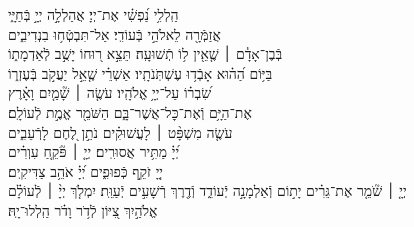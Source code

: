 \documentclass[twoside, openany, parskip=half, 11pt]{book}
\begin{document}
\negline

\ashrei


\begin{narrow}

\hfill \break
הַֽלְלִ֥י נַ֝פְשִׁ֗י אֶת־יְיָ׃ \hfill
אֲהַלְלָ֣ה יְיָ֣ בְּֿחַיָּ֑י \\ אֲזַמְּֿרָ֖ה לֵאלֹהַ֣י בְּֿעוֹדִֽי׃ \hfill
אַל־תִּבְטְֿח֥וּ בִנְדִיבִ֑ים \\ בְּֿבֶן־אָדָ֓ם ׀ שֶׁ֤אֵ֖ין ל֥וֹ תְֿשׁוּעָֽה׃ \hfill
תֵּצֵ֣א ר֭וּחוֹ יָשֻׁ֣ב לְֿאַדְמָת֑וֹ \\ בַּיּ֥וֹם הַ֝ה֗וּא אָבְֿד֥וּ עֶשְׁתֹּֽנֹתָֽיו׃ \hfill
אַשְׁרֵ֗י שֶׁ֤אֵ֣ל יַעֲקֹ֣ב בְּֿעֶזְר֑וֹ\\ שִׂ֝בְר֗וֹ עַל־יְיָ֥ אֱלֹהָֽיו׃ \hfill
עֹשֶׂ֤ה ׀ שָׁ֘מַ֤יִם וָאָ֗רֶץ \\ אֶת־הַיָּ֥ם וְֿאֶת־כׇּל־אֲשֶׁר־בָּ֑ם \hfill הַשֹּׁמֵ֖ר אֱמֶ֣ת לְֿעוֹלָֽם׃\\
עֹשֶׂ֤ה מִשְׁפָּ֨ט ׀ לָעֲשׁוּקִ֗ים \hfill נֹתֵ֣ן לֶ֭חֶם לָרְֿעֵבִ֑ים \\ יְ֝יָ֗ מַתִּ֥יר אֲסוּרִֽים׃ \hfill
יְיָ֤ ׀ פֹּ֘קֵ֤חַ עִוְרִ֗ים \\ יְיָ֭ זֹקֵ֣ף כְּֿפוּפִ֑ים \hfill יְ֝יָ֗ אֹהֵ֥ב צַדִּיקִֽים׃\\
יְיָ֤ ׀ שֹׁ֘מֵ֤ר אֶת־גֵּרִ֗ים יָת֣וֹם וְֿאַלְמָנָ֣ה יְֿעוֹדֵ֑ד וְֿדֶ֖רֶךְ רְֿשָׁעִ֣ים יְֿעַוֵּֽת׃ \hfill
יִמְלֹ֤ךְ יְיָ֨ ׀ לְֿעוֹלָ֗ם\\ אֱלֹהַ֣יִךְ צִ֭יּוֹן לְֿדֹ֥ר וָדֹ֗ר \hfill הַֽלְלוּ־יָֽהּ׃




\end{narrow}
\end{document}
